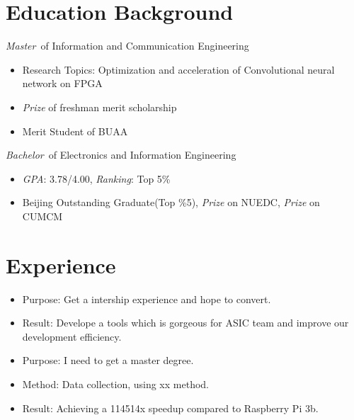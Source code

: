 \documentclass{resume}
\begin{document}
\section{\texorpdfstring{\faGraduationCap}{}  Education Background}
{\par \textit{Master}\ of Information and Communication Engineering \par}%
\begin{itemize}
  \item Research Topics: Optimization and acceleration of Convolutional neural network on FPGA
  \item \textit{ Prize} of freshman merit scholarship
  \item Merit Student of BUAA
\end{itemize}
{\par \textit{Bachelor}\ of Electronics and Information Engineering \par}%
\begin{itemize}
  \item \textit{GPA}: 3.78/4.00, \textit{Ranking}: Top 5\%
  \item Beijing Outstanding Graduate(Top \%5), \textit{ Prize} on NUEDC, \textit{ Prize} on CUMCM
\end{itemize}

\section{\texorpdfstring{\faUsers}{} Experience}
\begin{itemize}
  \item Purpose: Get a intership experience and hope to convert.
  \item Result: Develope a tools which is gorgeous for ASIC team and improve our development efficiency.
\end{itemize}

\begin{itemize}
  \item Purpose: I need to get a master degree.
  \item Method: Data collection, using xx method.
  \item Result: Achieving a 114514x speedup compared to Raspberry Pi 3b.
\end{itemize}
\end{document}
